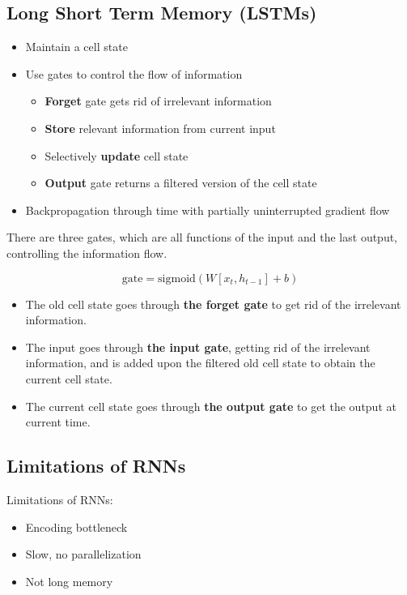 \documentclass[12pt, a4paper, oneside]{article}
\begin{document}
\subsection{Long Short Term Memory (LSTMs)}

\begin{itemize}
    \item Maintain a cell state
    \item Use gates to control the flow of information
    \begin{itemize}
        \item \textbf{Forget} gate gets rid of irrelevant information
        \item \textbf{Store} relevant information from current input
        \item Selectively \textbf{update} cell state
        \item \textbf{Output} gate returns a filtered version of the cell state
    \end{itemize}
    \item Backpropagation through time with partially uninterrupted gradient flow
\end{itemize}

There are three gates, which are all functions of the input and the last output, controlling the information flow.

\begin{equation*}
    \text{gate}=\text{sigmoid}(W[x_{t},h_{t-1}]+b)
\end{equation*}

\begin{itemize}
    \item The old cell state goes through \textbf{the forget gate} to get rid of the irrelevant information.
    \item The input goes through \textbf{the input gate}, getting rid of the irrelevant information, and is added upon the filtered old cell state to obtain the current cell state.
    \item The current cell state goes through \textbf{the output gate} to get the output at current time.
\end{itemize}

\subsection{Limitations of RNNs}

Limitations of RNNs:
\begin{itemize}
    \item Encoding bottleneck
    \item Slow, no parallelization
    \item Not long memory
\end{itemize}
\end{document}
